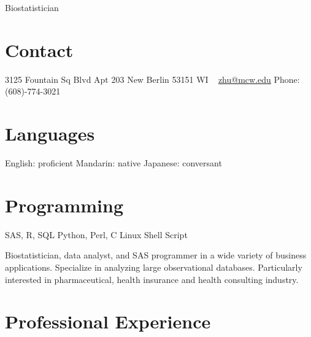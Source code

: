 \documentclass[11pt, print]{friggeri-cv}
\begin{document}
       {Biostatistician}

\begin{aside}
  \section{Contact}
    3125 Fountain Sq Blvd
    Apt 203
    New Berlin
    53151 WI
    ~
    \href{mailto:zhu@mcw.edu}{zhu@mcw.edu}
    Phone: (608)-774-3021
  \section{Languages}
    English: proficient
    Mandarin: native
    Japanese: conversant
  \section{Programming}
    SAS, R, SQL
    Python, Perl, C
    Linux Shell Script
\end{aside}

Biostatistician, data analyst, and SAS programmer in a wide variety of business applications. Specialize in analyzing large observational databases. Particularly interested in pharmaceutical, health insurance and health consulting industry.\\

\section{Professional Experience}
\end{document}
